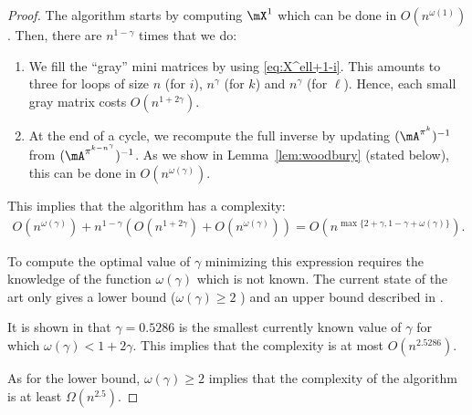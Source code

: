 \begin{proof}
    The algorithm starts by computing $\mX^1$ which can be done in $O( n^{\omega(1)})$. Then, there are $ n^{1-\gamma} $ times that we do:
    \begin{enumerate}
        \item We fill the ``gray'' mini matrices by using \eqref{eq:X^ell+1-i}. This amounts to three for loops of size $n$ (for $i$), $ n^\gamma $ (for $k$) and $ n^\gamma $ (for $\ell$). Hence, each small gray matrix costs $O( n^{1+2\gamma} )$.
        \item At the end of a cycle, we recompute the full inverse by updating $(\mA^{\pi^k})^{-1}$ from $(\mA^{\pi^{k- n^\gamma }})^{-1}$. As we show in Lemma~\ref{lem:woodbury} (stated below), this can be done in $O( n^{\omega(\gamma)} )$.
    \end{enumerate}
This implies that the algorithm has a complexity:
    \begin{align*}
        O( n^{\omega(\gamma)} ) +  n^{1-\gamma}  \left(O( n^{1+2\gamma} )+O( n^{\omega(\gamma)} )\right)  = O( n^{\max\{2+\gamma, 1-\gamma + \omega(\gamma)\}} ).
    \end{align*}
    
    To compute the optimal value of $\gamma$ minimizing this expression requires the knowledge of the function 
    $\omega(\gamma)$ which is  not known. The current state of the art  only gives  a lower bound ($\omega(\gamma) \geq 2$ ) and an upper bound described in  \cite{gall2018improved}.
    
    It is shown in \cite{gall2018improved} that $\gamma=0.5286$ is the smallest currently known value of $\gamma$ for which  $\omega(\gamma)<1+2\gamma$. This implies that the complexity is  at most $O(n^{2.5286})$.
    
    As for the lower bound,  $\omega(\gamma) \geq 2$ implies that the complexity of the
    algorithm is at least  $\Omega(n^{2.5})$.
\end{proof}
  
